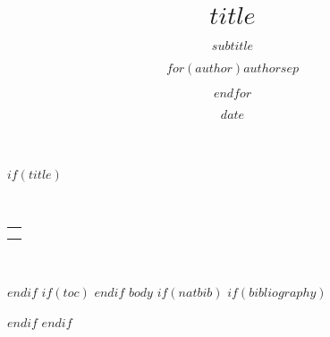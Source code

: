 \documentclass[10pt,a4paper,parskip=half]{scrartcl}
\title{$title$}
\subtitle{$subtitle$}
\author{$for(author)$$author$$sep$ \and $endfor$}
\date{$date$}
\makeatletter
\theoremstyle{plain}
\def\maketitle{%
    \begin{minipage}[t]{0.8\linewidth}%
        \flushleft%
        \LARGE\sffamily\@title\\
        \large\sffamily\@subtitle
    \end{minipage}%
    \hfill%
    \begin{minipage}[t]{0.2\linewidth}%
        \flushright\sffamily%
        \begin{tabular}[t]{r}\@author\\\@date\end{tabular}\\
    \end{minipage}%
}
\makeatother
\begin{document}
$if(title)$
\maketitle
$endif$
$if(toc)$
\tableofcontents
\newpage
$endif$
$body$
$if(natbib)$
$if(bibliography)$

$endif$
$endif$
\end{document}

